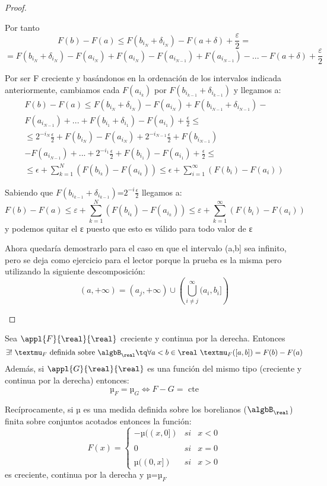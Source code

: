 \documentclass{apuntes}
\begin{document}
\begin{proof}
\begin{enumerate}

Por tanto
\[F(b) - F(a) \leq F(b_{i_N}+\delta_{i_N})-F(a + \delta) + \frac{ε}{2} =\]
\[= F(b_{i_N}+\delta_{i_N})-F(a_{i_N})+F(a_{i_N})-F(a_{i_{N-1}})+F(a_{i_{N-1}})- ... -F(a + \delta) + \frac{ε}{2}\]

Por ser F creciente y basándonos en la ordenación de los intervalos indicada anteriormente, cambiamos cada $F(a_{i_k})$ por $F(b_{i_{k-1}}+\delta_{i_{k-1}})$ y llegamos a:
\begin{gather*}
F(b)-F(a) \leq
F(b_{i_N} + \delta_{i_N}) - F(a_{i_N}) + F(b_{i_{N-1}} + \delta_{i_{N-1}}) -\\
F(a_{i_{N-1}}) + ... +F(b_{i_1} + \delta_{i_1})-F(a_{i_1}) + \frac{\epsilon}{2} \leq \\
\leq 2^{-i_N}\frac{\epsilon}{2} + F(b_{i_N}) - F(a_{i_N}) + 2^{-i_{N-1}}\frac{\epsilon}{2} + F(b_{i_{N-1}}) \\
- F(a_{i_{N-1}}) + ... + 2^{-i_1}\frac{\epsilon}{2} + F(b_{i_1}) - F(a_{i_1}) +
\frac{\epsilon}{2} \leq \\
\leq \epsilon + \sum_{k=1}^N\left( F(b_{i_k}) - F(a_{i_k}) \right) \leq \epsilon +
\sum_{i=1}^{\infty}\left( F(b_i) - F(a_i) \right)
\end{gather*}

Sabiendo que $F(b_{i_{k-1}}+\delta_{i_{k-1}})$=$2^{-i}\frac{\epsilon}{2}$ llegamos a:
\[F(b)-F(a) \leq ε + \sum_{k=1}^N(F(b_{i_k})-F(a_{i_k})) \leq ε + \sum_{k=1}^{\infty}(F(b_i)-F(a_i))\]
y podemos quitar el ε puesto que esto es válido para todo valor de ε

Ahora quedaría demostrarlo para el caso en que el intervalo (a,b] sea infinito, pero se deja como ejercicio para el lector porque la prueba es la misma pero utilizando la siguiente descomposición:
\[ (a, +\infty) = (a_j, +\infty) \cup \left( \bigcup_{i \neq j}^{\infty}(a_i, b_i] \right) \]
\end{enumerate}
\end{proof}

\begin{theorem}
Sea $\appl{F}{\real}{\real}$ creciente y continua por la derecha. Entonces
\[\exists ! \ µ_F \text{ definida sobre } \algbB_{\real} \tq \forall a<b \in \real \ µ_F([a,b])=F(b)-F(a)\]
Además, si $\appl{G}{\real}{\real}$ es una función del mismo tipo (creciente y continua por la derecha) entonces:
\[µ_F = µ_G \iff F-G = \text{ cte}\]

Recíprocamente, si µ es una medida definida sobre los borelianos ($\algbB_{\real}$) finita sobre conjuntos acotados entonces la función:
\[F(x)= \left\{ \begin{array}{lcc}
             -µ((x,0]) &   si  & x < 0 \\
             \\ 0 &  si & x=0 \\
             \\ µ((0, x]) &  si  & x > 0
             \end{array}
   \right.\]
es creciente, continua por la derecha y µ=$µ_F$
\end{theorem}
\end{document}
